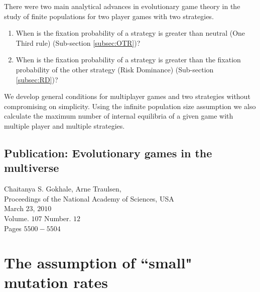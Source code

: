 \documentclass[oneside,11pt,a4paper]{book}
\begin{document}
There were two main analytical advances in evolutionary game theory in the study of finite populations
for two player games with two strategies.
%
\begin{enumerate}
\item When is the fixation probability of a strategy is greater than neutral (One Third rule) (Sub-section \ref{subsec:OTR})?
\item When is the fixation probability of a strategy is greater than the fixation probability of the other strategy (Risk Dominance) (Sub-section \ref{subsec:RD})?
\end{enumerate}
%
We develop general conditions for multiplayer games and two strategies without compromising on simplicity.
Using the infinite population size assumption we also calculate the maximum number of internal equilibria of a given game with multiple player and multiple strategies.

\newpage
\subsection{Publication: Evolutionary games in the multiverse}

Chaitanya S. Gokhale, Arne Traulsen,\\
Proceedings of the National Academy of Sciences, USA\\
March $23$, $2010$\\
Volume. $107$ Number. $12$\\
Pages $5500-5504$





\section{The assumption of ``small" mutation rates}
\label{sec:wgt}

\graphicspath{{Figs_WGT/}{Figs_WGT/}{Figs_WGT/}}
\end{document}
